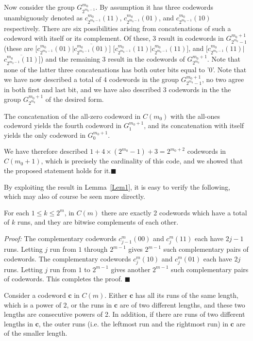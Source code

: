 Now consider the group $G_{2^{m_0-1}}^{m_0}$. By assumption it has
three codewords unambiguously denoted as
$c_{2^{m_0-1}}^{m_0}(11)$, $c_{2^{m_0-1}}^{m_0}(01)$, and
$c_{2^{m_0 -1}}^{m_0}(10)$ respectively. There are six
possibilities arising from concatenations of such a codeword with
itself or its complement. Of these, 3 result in codewords in
$G_{2^{m_0}-1}^{m_0+1}$ (these are $[c_{2^{m_0 -1}}^{m_0}(01)
|$$\overline {c_{2^{m_0-1}}^{m_0}(01)}]$ $[c_{2^{m_0
-1}}^{m_0}(11) |$$c_{2^{m_0 -1}}^{m_0}(11)]$, and $[c_{2^{m_0
-1}}^{m_0}(11) |$$\overline{c_{2^{m_0 -1}}^{m_0}(11)}]$) and the
remaining 3 result in the codewords of $G_{2^{m_0}}^{m_0+1}$. Note
that none of the latter three concatenations has both outer bits
equal to '0'. Note that we have now described a total of 4
codewords in the group $G_{2^{m_0}-1}^{m_0+1}$, no two agree in
both first and last bit, and we have also described 3 codewords in
the the group $G_{2^{m_0}}^{m_0+1}$ of the desired form.

The concatenation of the all-zero codeword in $C(m_0)$ with the
all-ones codeword yields the fourth codeword in $G_1^{m_0+1}$, and
its concatenation with itself yields the only codeword in $G_0^{m_0+1}$.

We have therefore described $1+4\times(2^{m_0}-1)+3=2^{m_0+2}$
codewords in $C(m_0+1)$, which is precisely the cardinality of
this code, and we showed that the proposed statement holds for
it.\hfill $\blacksquare$

By exploiting the result in Lemma~\ref{Lem1},
it is easy to verify
the following, which may also of course
be seen more directly.

\begin{lemma}\label{LE2}
For each $1 \leq k \leq 2^m$,
in $C(m)$ there are exactly 2 codewords which have a total of $k$
runs, and they are bitwise complements of each
other.
\end{lemma}

\noindent \textit{Proof:} The complementary codewords
$c_{j-1}^m(00)$ and $c_{j}^m(11)$ each have $2j-1$ runs. Letting
$j$ run from $1$ through $2^{m-1}$ gives $2^{m-1}$ such
complementary pairs of codewords. The complementary codewords
$c_j^m(10)$ and $c_j^m(01)$ each have
 $2j$ runs. Letting
$j$ run from $1$ to $2^{m-1}$
gives another
$2^{m-1}$ such complementary pairs
of codewords.
This completes the proof. \hfill $\blacksquare$


\begin{lemma}\label{LE3}
Consider a codeword $\mathbf{c}$ in $C(m)$. Either $\mathbf{c}$
has all its runs of the same length, which is a power of $2$, or
the runs in $\mathbf{c}$ are of two different lengths, and these
two lengths are consecutive powers of 2. In addition, if there are
runs of two different lengths in $\mathbf{c}$, the outer runs
(i.e. the leftmost run and the rightmost run) in $\mathbf{c}$ are
of the smaller length.
\end{lemma}

